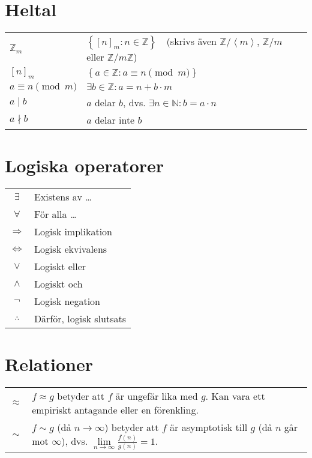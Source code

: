 \section{Heltal}

\begin{tabular}{lp{10.5cm}}
$\mathbb{Z}_m$ & $\left\lbrace \left[ n \right] _m : n \in \mathbb{Z}\right\rbrace$ \,\, (skrivs även $\mathbb{Z}/\left\langle m \right\rangle$, $\mathbb{Z}/m$ eller $\mathbb{Z}/{m\mathbb{Z}}$) \\
$\left[ n \right] _m$ & $\left\lbrace a \in \mathbb{Z} : a \equiv n \pmod{m}\right\rbrace$ \\
$a \equiv n \pmod{m}$ & $\exists b \in \mathbb{Z} : a = n + b \cdot m$ \\
$a \mid b$ & $a$ delar $b$, dvs. $\exists n \in \mathbb{N} : b = a \cdot n$ \\
$a \nmid b$ & $a$ delar inte $b$
\end{tabular}

\section{Logiska operatorer}

\begin{tabular}{cp{10.5cm}}
$\exists$ & Existens av \ldots \\
$\forall$ & För alla \ldots \\
$\Longrightarrow$ & Logisk implikation \\
$\Longleftrightarrow$ & Logisk ekvivalens \\
$\vee$ & Logiskt eller \\
$\wedge$ & Logiskt och \\
$\neg$ & Logisk negation \\
$\therefore$ & Därför, logisk slutsats
\end{tabular}

\section{Relationer}

\begin{tabular}{cp{10.5cm}}
$\approx$ & $f \approx g$ betyder att $f$ är ungefär lika med $g$. Kan vara ett empiriskt antagande eller en förenkling.\\
$\sim$ & $f \sim g$ (då $n \rightarrow \infty$) betyder att $f$ är asymptotisk till $g$ (då $n$ går mot $\infty$), dvs. $\lim\limits_{n \rightarrow \infty}\frac{f(n)}{g(n)}=1$.\\
\end{tabular}

